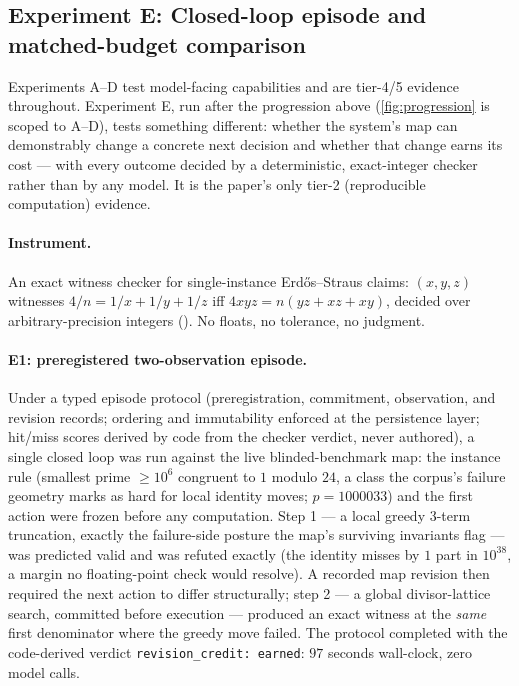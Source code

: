 \documentclass[11pt]{article}
\theoremstyle{gowthm}
\theoremstyle{gowplain}
\begin{document}
\subsection{Experiment E: Closed-loop episode and matched-budget comparison}
\label{sec:results-episode}

Experiments A--D test model-facing capabilities and are tier-4/5 evidence
throughout. Experiment E, run after the progression above
(\cref{fig:progression} is scoped to A--D), tests something different: whether
the system's map can demonstrably change a concrete next decision and whether
that change earns its cost --- with every outcome decided by a deterministic,
exact-integer checker rather than by any model. It is the paper's only
tier-2 (reproducible computation) evidence.

\paragraph{Instrument.}
An exact witness checker for single-instance Erd\H{o}s--Straus claims:
$(x,y,z)$ witnesses $4/n = 1/x + 1/y + 1/z$ iff
$4xyz = n(yz + xz + xy)$, decided over arbitrary-precision integers
(). No floats, no tolerance, no judgment.

\paragraph{E1: preregistered two-observation episode.}
Under a typed episode protocol (preregistration, commitment, observation, and
revision records; ordering and immutability enforced at the persistence
layer; hit/miss scores derived by code from the checker verdict, never
authored), a single closed loop was run against the live blinded-benchmark
map: the instance rule (smallest prime $\geq 10^6$ congruent to $1$ modulo
$24$, a class the corpus's failure geometry marks as hard for local identity
moves; $p = 1000033$) and the first action were frozen before any
computation. Step 1 --- a local greedy 3-term truncation, exactly the
failure-side posture the map's surviving invariants flag --- was predicted
valid and was refuted exactly (the identity misses by $1$ part in $10^{38}$,
a margin no floating-point check would resolve). A recorded map revision
then required the next action to differ structurally; step 2 --- a global
divisor-lattice search, committed before execution --- produced an exact
witness at the \emph{same} first denominator where the greedy move failed.
The protocol completed with the code-derived verdict
\texttt{revision\_credit: earned}: $97$ seconds wall-clock, zero model calls.
\end{document}
